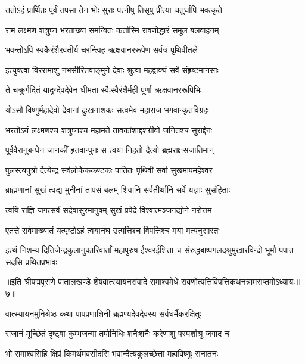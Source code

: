 \twolineshloka
{ततोऽहं प्रार्थितः पूर्वं तपसा तेन भोः सुराः}
{पत्नीषु तिसृषु प्रीत्या चतुर्धापि भवत्कृते}%

\twolineshloka
{राम लक्ष्मण शत्रुघ्न भरताख्या समन्वितः}
{कर्तास्मि रावणोद्धारं समूल बलवाहनम्}%

\twolineshloka
{भवन्तोऽपि स्वकैरंशैरवतीर्य चरन्त्विह}
{ऋक्षवानररूपेण सर्वत्र पृथिवीतले}%

\twolineshloka
{इत्युक्त्वा विररामाशु नभसीरितवाङ्मुने}
{देवाः श्रुत्वा महद्वाक्यं सर्वे संहृष्टमानसाः}%

\twolineshloka
{ते चक्रुर्गदितं यादृग्देवदेवेन धीमता}
{स्वैःस्वैरंशैर्मही पूर्णा ऋक्षवानररूपिभिः}%

\twolineshloka
{योऽसौ विष्णुर्महादेवो देवानां दुःखनाशकः}
{सत्वमेव महाराज भगवान्कृतविग्रहः}%

\twolineshloka
{भरतोऽयं लक्ष्मणश्च शत्रुघ्नश्च महामते}
{तावकांशाद्दशग्रीवो जनितश्च सुरार्द्दनः}%

\twolineshloka
{पूर्ववैरानुबन्धेन जानकीं हृतवान्पुनः}
{स त्वया निहतो दैत्यो ब्रह्मराक्षसजातिमान्}%

\twolineshloka
{पुलस्त्यपुत्रो दैत्येन्द्र सर्वलोकैककण्टकः}
{पातितः पृथिवी सर्वा सुखमापमहेश्वर}%

\twolineshloka
{ब्राह्मणानां सुखं त्वद्य मुनीनां तापसं बलम्}
{शिवानि सर्वतीर्थानि सर्वे यज्ञाः सुसंहिताः}%

\twolineshloka
{त्वयि राज्ञि जगत्सर्वं सदेवासुरमानुषम्}
{सुखं प्रपेदे विश्वात्मञ्जगद्योने नरोत्तम}%

\twolineshloka
{एतत्ते सर्वमाख्यातं यत्पृष्टोऽहं त्वयानघ}
{उत्पत्तिश्च विपत्तिश्च मया मत्यनुसारतः}%

\twolineshloka
{इत्थं निशम्य दितिजेन्द्रकुलानुकारिवार्तां महापुरुष ईश्वरईशिता च}
{संरुद्धबाष्पगलदश्रुमुखारविन्दो भूमौ पपात सदसि प्रथितप्रभावः}%

{॥इति श्रीपद्मपुराणे पातालखण्डे शेषवात्स्यायनसंवादे रामाश्वमेधे रावणोत्पत्तिविपत्तिकथनन्नामसप्तमोऽध्यायः॥७॥}



\twolineshloka
{वात्स्यायनमुनिश्रेष्ठ कथा पापप्रणाशिनी}
{ब्रह्मण्यदेवदेवस्य सर्वधर्मैकरक्षितुः}%

\twolineshloka
{राजानं मूर्च्छितं दृष्ट्वा कुम्भजन्मा तपोनिधिः}
{शनैःशनैः करेणाशु पस्पर्शाश्रु जगाद च}%

\twolineshloka
{भो रामाश्वसिहि क्षिप्रं किमर्थमवसीदसि}
{भवान्दैत्यकुलच्छेत्ता महाविष्णुः सनातनः}%

